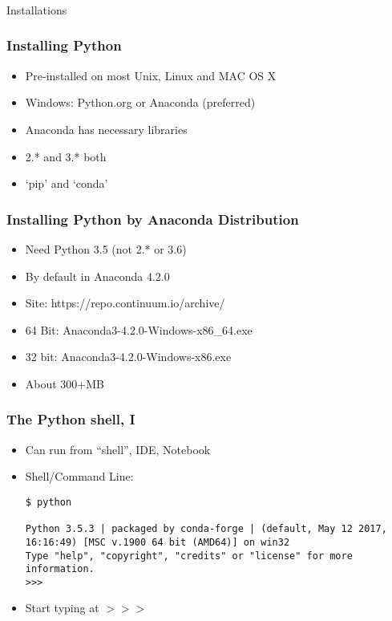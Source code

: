 \begin{frame}[fragile]\frametitle{}
\begin{center}
{\Large Installations}
\end{center}
\end{frame}

\begin{frame}[fragile]\frametitle{Installing Python}
  \begin{itemize}
  \item Pre-installed on most Unix, Linux and MAC OS X
   \item Windows: Python.org or Anaconda (preferred)
   \item Anaconda has necessary libraries
\item 2.* and 3.* both
\item `pip' and `conda'
  \end{itemize}
\end{frame}

\begin{frame}[fragile]\frametitle{Installing Python by Anaconda Distribution}
  \begin{itemize}
  \item Need Python 3.5 (not 2.* or 3.6)
  \item By default in Anaconda 4.2.0
  \item Site: https://repo.continuum.io/archive/
  \item 64 Bit: Anaconda3-4.2.0-Windows-x86\_64.exe
  \item 32 bit: Anaconda3-4.2.0-Windows-x86.exe
  \item About 300+MB
  \end{itemize}
\end{frame}

\begin{frame}[fragile]  \frametitle{The Python shell, I}
  \begin{itemize}
 \item Can run from ``shell'', IDE, Notebook
 \item Shell/Command Line:
\begin{lstlisting}
$ python

Python 3.5.3 | packaged by conda-forge | (default, May 12 2017, 16:16:49) [MSC v.1900 64 bit (AMD64)] on win32
Type "help", "copyright", "credits" or "license" for more information.
>>>
\end{lstlisting}
\item Start typing at  $>>>$ 
\end{itemize}
\end{frame}

